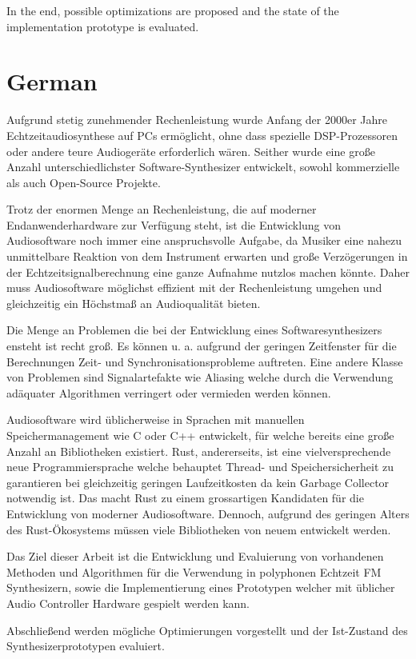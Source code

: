 In the end, possible optimizations are proposed and the state of the implementation prototype is evaluated.

\section*{German}

Aufgrund stetig zunehmender Rechenleistung wurde Anfang der 2000er Jahre Echtzeitaudiosynthese auf PCs ermöglicht, ohne dass spezielle DSP-Prozessoren oder andere teure Audiogeräte erforderlich wären.
Seither wurde eine große Anzahl unterschiedlichster Software-Synthesizer entwickelt, sowohl kommerzielle als auch Open-Source Projekte.

Trotz der enormen Menge an Rechenleistung, die auf moderner Endanwenderhardware zur Verfügung steht, ist die Entwicklung von Audiosoftware noch immer eine anspruchsvolle Aufgabe, da Musiker eine nahezu unmittelbare Reaktion von dem Instrument erwarten und große Verzögerungen in der Echtzeitsignalberechnung eine ganze Aufnahme nutzlos machen könnte.
Daher muss Audiosoftware möglichst effizient mit der Rechenleistung umgehen und gleichzeitig ein Höchstmaß an Audioqualität bieten.

Die Menge an Problemen die bei der Entwicklung eines Softwaresynthesizers ensteht ist recht groß.
Es können u. a. aufgrund der geringen Zeitfenster für die Berechnungen Zeit- und Synchronisationsprobleme auftreten.
Eine andere Klasse von Problemen sind Signalartefakte wie Aliasing welche durch die Verwendung adäquater Algorithmen verringert oder vermieden werden können.

Audiosoftware wird üblicherweise in Sprachen mit manuellen Speichermanagement wie C oder C++ entwickelt, für welche bereits eine große Anzahl an Bibliotheken existiert.
Rust, andererseits, ist eine vielversprechende neue Programmiersprache welche behauptet Thread- und Speichersicherheit zu garantieren bei gleichzeitig geringen Laufzeitkosten da kein Garbage Collector notwendig ist.
Das macht Rust zu einem grossartigen Kandidaten für die Entwicklung von moderner Audiosoftware.
Dennoch, aufgrund des geringen Alters des Rust-Ökosystems müssen viele Bibliotheken von neuem entwickelt werden.

Das Ziel dieser Arbeit ist die Entwicklung und Evaluierung von vorhandenen Methoden und Algorithmen für die Verwendung in polyphonen Echtzeit FM Synthesizern, sowie die Implementierung eines Prototypen welcher mit üblicher Audio Controller Hardware gespielt werden kann.

Abschließend werden mögliche Optimierungen vorgestellt und der Ist-Zustand des Synthesizerprototypen evaluiert.

\sffamily{
	\begin{center}
		\textbf{\documentAuthor{}}\\
		\textsc{\university{}}\\
		\universityFaculty{}---\universityDepartment{}\\
		\documentTitle{}\\
		\germanDate{}\today{}\\
		\bigskip{}
	\end{center}
}
